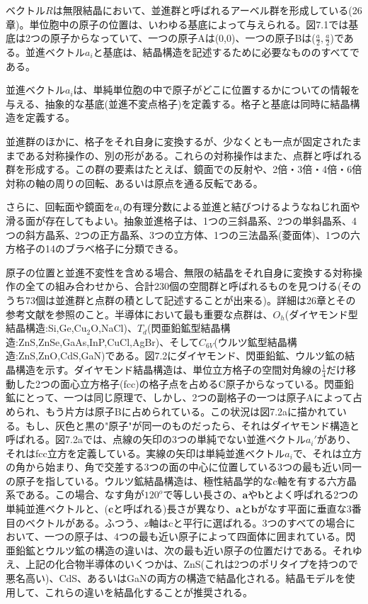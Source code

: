 \documentclass[11pt,a4j,uplatex]{jsarticle}
\begin{document}
ベクトル$R$は無限結晶において、並進群と呼ばれるアーベル群を形成している(26章)。単位胞中の原子の位置は、いわゆる基底によって与えられる。図7.1では基底は2つの原子からなっていて、一つの原子Aは(0,0)、一つの原子Bは($\frac{a}{2},\frac{a}{2}$)である。並進ベクトル$a_i$と基底は、結晶構造を記述するために必要なもののすべてである。

並進ベクトル$a_i$は、単純単位胞の中で原子がどこに位置するかについての情報を与える、抽象的な基底(並進不変点格子)を定義する。格子と基底は同時に結晶構造を定義する。

並進群のほかに、格子をそれ自身に変換するが、少なくとも一点が固定されたままである対称操作の、別の形がある。これらの対称操作はまた、点群と呼ばれる群を形成する。この群の要素はたとえば、鏡面での反射や、2倍・3倍・4倍・6倍対称の軸の周りの回転、あるいは原点を通る反転である。

さらに、回転面や鏡面を$a_i$の有理分数による並進と結びつけるようなねじれ面や滑る面が存在してもよい。抽象並進格子は、1つの三斜晶系、2つの単斜晶系、4つの斜方晶系、2つの正方晶系、3つの立方体、1つの三法晶系(菱面体)、1つの六方格子の14のブラベ格子に分類できる。

原子の位置と並進不変性を含める場合、無限の結晶をそれ自身に変換する対称操作の全ての組み合わせから、合計230個の空間群と呼ばれるものを見つける(そのうち73個は並進群と点群の積として記述することが出来る)。詳細は26章とその参考文献を参照のこと。半導体において最も重要な点群は、$O_h$(ダイヤモンド型結晶構造:Si,Ge,$\mathrm{Cu_2O}$,NaCl)、$T_d$(閃亜鉛鉱型結晶構造:ZnS,ZnSe,GaAs,InP,CuCl,AgBr)、そして$C_{6V}$(ウルツ鉱型結晶構造:ZnS,ZnO,CdS,GaN)である。図7.2にダイヤモンド、閃亜鉛鉱、ウルツ鉱の結晶構造を示す。ダイヤモンド結晶構造は、単位立方格子の空間対角線の$\frac{1}{4}$だけ移動した2つの面心立方格子(fcc)の格子点を占めるC原子からなっている。閃亜鉛鉱にとって、一つは同じ原理で、しかし、2つの副格子の一つは原子Aによって占められ、もう片方は原子Bに占められている。この状況は図7.2aに描かれている。もし、灰色と黒の"原子"が同一のものだったら、それはダイヤモンド構造と呼ばれる。図7.2aでは、点線の矢印の3つの単純でない並進ベクトル$a_i'$があり、それはfcc立方を定義している。実線の矢印は単純並進ベクトル$a_i$で、それは立方の角から始まり、角で交差する3つの面の中心に位置している3つの最も近い同一の原子を指している。ウルツ鉱結晶構造は、極性結晶学的なc軸を有する六方晶系である。この場合、なす角が$120^o$で等しい長さの、$\bm{a}$や$\bm{b}$とよく呼ばれる2つの単純並進ベクトルと、($\bm{c}$と呼ばれる)長さが異なり、$\bm{a}$と$\bm{b}$がなす平面に垂直な3番目のベクトルがある。ふつう、z軸はcと平行に選ばれる。3つのすべての場合において、一つの原子は、4つの最も近い原子によって四面体に囲まれている。閃亜鉛鉱とウルツ鉱の構造の違いは、次の最も近い原子の位置だけである。それゆえ、上記の化合物半導体のいくつかは、ZnS(これは2つのポリタイプを持つので悪名高い)、CdS、あるいはGaNの両方の構造で結晶化される。結晶モデルを使用して、これらの違いを結晶化することが推奨される。
\end{document}
